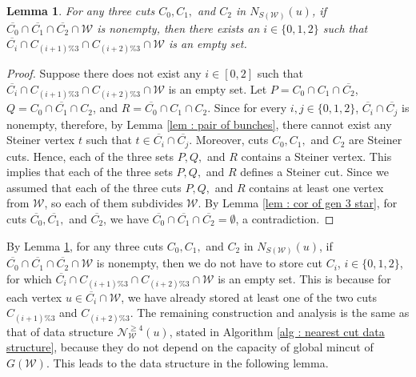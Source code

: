 \documentclass[letterpaper,11pt]{article}
\newtheorem{lemma}{Lemma}[]
\begin{document}
\begin{lemma} \label{lem : storing at most two cuts are sufficient}
    For any three cuts $C_0,C_1,$ and $C_2$ in $N_{S({\mathcal W})}(u)$, if $\overline{C_0}\cap \overline{C_1}\cap \overline{C_2}\cap {\mathcal W}$ is nonempty, then there exists an $i\in \{0,1,2\}$ such that $\overline{C_i}\cap C_{(i+1)\%3}\cap C_{(i+2)\%3}\cap {\mathcal W}$ is an empty set. 
\end{lemma}
\begin{proof}
    Suppose there does not exist any $i\in [0,2]$ such that $\overline{C_i}\cap C_{(i+1)\%3}\cap C_{(i+2)\%3}\cap {\mathcal W}$ is an empty set. Let $P=C_0\cap C_1\cap \overline{C_2}$, $Q=C_0\cap \overline{C_1}\cap C_2$, and $R=\overline{C_0}\cap C_1\cap C_2$. Since for every $i,j\in\{0,1,2\}$, $\overline{C_i}\cap \overline{C_j}$ is nonempty, therefore, by Lemma \ref{lem : pair of bunches}, there cannot exist any Steiner vertex $t$ such that $t\in \overline{C_i}\cap \overline{C_j}$. Moreover, cuts $C_0,C_1,$ and $C_2$ are Steiner cuts.  Hence, each of the three sets $P,Q,$ and $R$ contains a Steiner vertex. This implies that each of the three sets $P,Q,$ and $R$ defines a Steiner cut. Since we assumed that each of the three cuts $P,Q,$ and $R$ contains at least one vertex from ${\mathcal W}$, so each of them subdivides ${\mathcal W}$. By Lemma \ref{lem : cor of gen 3 star}, for cuts $\overline{C_0}, \overline{C_1},$ and $\overline{C_2}$, we have $\overline{C_0}\cap \overline{C_1}\cap \overline{C_2}=\emptyset$, a contradiction.
\end{proof}
By Lemma \ref{lem : storing at most two cuts are sufficient}, for any three cuts $C_0,C_1,$ and $C_2$ in $N_{S({\mathcal W})}(u)$, if $\overline{C_0}\cap \overline{C_1}\cap \overline{C_2}\cap {\mathcal W}$ is nonempty, then we do not have to store cut $C_i$, $i\in \{0,1,2\}$, for which $\overline{C_i}\cap C_{(i+1)\%3}\cap C_{(i+2)\%3}\cap {\mathcal W}$ is an empty set. This is because for each vertex $u\in \overline{C_i}\cap {\mathcal W}$, we have already stored at least one of the two cuts $C_{(i+1)\%3}$ and $ C_{(i+2)\%3}$. The remaining construction and analysis is the same as that of data structure ${\mathcal N}^{\ge 4}_{\mathcal W}(u)$, stated in Algorithm \ref{alg : nearest cut data structure}, because they do not depend on the capacity of global mincut of $G({\mathcal W})$. 
This leads to the data structure in the following lemma. 
\end{document}
